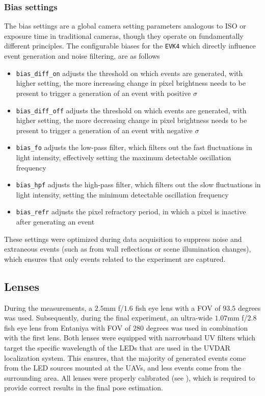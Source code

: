 \subsubsection{Bias settings}
The bias settings are a global camera setting parameters analogous to ISO or exposure time in traditional cameras, though they operate on fundamentally
different principles.
The configurable biases for the \texttt{EVK4} which directly influence event generation and noise filtering, are as follows\cite{dilmaghani2022controlevaluationeventcameras}
\begin{itemize}
    \item \texttt{bias\_diff\_on} adjusts the threshold on which events are generated, with higher setting, the more increasing change in pixel brightness needs to be present to trigger a generation of an event with positive $\sigma$
    \item \texttt{bias\_diff\_off} adjusts the threshold on which events are generated, with higher setting, the more decreasing change in pixel brightness needs to be present to trigger a generation of an event with negative $\sigma$
    \item \texttt{bias\_fo} adjusts the low-pass filter, which filters out the fast fluctuations in light intensity, effectively setting the maximum detectable oscillation frequency
    \item \texttt{bias\_hpf} adjusts the high-pass filter, which filters out the slow fluctuations in light intensity, setting the minimum detectable oscillation frequency
    \item \texttt{bias\_refr} adjusts the pixel refractory period, in which a pixel is inactive after generating an event
\end{itemize}
These settings were optimized during data acquisition to suppress noise and extraneous events (such as from wall reflections or scene illumination changes), which
ensures that only events related to the experiment are captured.

\subsection{Lenses}
During the measurements, a $2.5$mm f/$1.6$ fish eye lens with a \ac{FOV} of $93.5$ degrees was used. Subsequently, during the final experiment, an ultra-wide $1.07$mm f/$2.8$ fish eye lens from Entaniya with \ac{FOV} of $280$ degrees was used in combination with the first lens.
Both lenses were equipped with narrowband \ac{UV} filters which target the specific wavelength of the \ac{LED}s that are used in the UVDAR localization system.
This ensures, that the majority of generated events come from the \ac{LED} sources mounted at the \ac{UAV}s, and less events come from the surrounding area.
All lenses were properly calibrated (see ), which is required to provide correct results in the final pose estimation.

